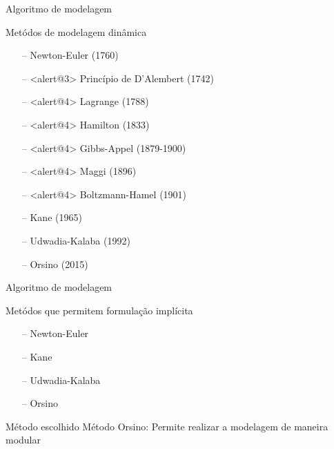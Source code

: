 \documentclass[25pt,landscape]{beamer}
\begin{document}
\begin{frame}{Algoritmo de modelagem}
    \begin{block}{Met\'odos de modelagem din\^amica}
        \pause
        \begin{itemize}
            \item[--] Newton-Euler (1760)  \\[4pt]
            \item[--] <alert@3> Princ\'ipio de D'Alembert (1742) \\[4pt]
            \item[--] <alert@4> Lagrange (1788) \\[4pt]
            \item[--] <alert@4> Hamilton (1833) \\[4pt]
            \item[--] <alert@4> Gibbs-Appel (1879-1900) \\[4pt]
            \item[--] <alert@4> Maggi (1896) \\[4pt]
            \item[--] <alert@4> Boltzmann-Hamel (1901) \\[4pt]
            \item[--] Kane (1965) \\[4pt]
            \item[--] Udwadia-Kalaba (1992) \\[4pt]
            \item[--] Orsino (2015) \\[4pt]
        \end{itemize}
    \end{block}
\end{frame}

\begin{frame}{Algoritmo de modelagem}
    \begin{block}{Met\'odos que permitem formula\c{c}\~ao impl\'icita}
        \pause
        \begin{itemize}
            \item[--] Newton-Euler \\[4pt]
            \item[--] Kane \\[4pt]
            \item[--] Udwadia-Kalaba \\[4pt]
            \item[--] Orsino \\[4pt]
        \end{itemize}
    \end{block}
    \pause
    \begin{block}{M\'etodo escolhido}
        \pause
        M\'etodo Orsino: \pause Permite realizar a modelagem de maneira modular
    \end{block}
\end{frame}
\end{document}
